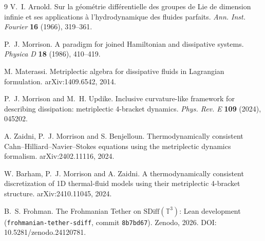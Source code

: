 \documentclass[11pt,a4paper]{article}
\begin{document}
\begin{thebibliography}{9}
V.~I. Arnold.
\newblock Sur la géométrie différentielle des groupes de Lie de dimension infinie et ses applications à l'hydrodynamique des fluides parfaits.
\newblock \emph{Ann. Inst. Fourier} \textbf{16} (1966), 319--361.

P.~J. Morrison.
\newblock A paradigm for joined Hamiltonian and dissipative systems.
\newblock \emph{Physica D} \textbf{18} (1986), 410--419.

M. Materassi.
\newblock Metriplectic algebra for dissipative fluids in Lagrangian formulation.
\newblock arXiv:1409.6542, 2014.

P.~J. Morrison and M.~H. Updike.
\newblock Inclusive curvature-like framework for describing dissipation: metriplectic 4-bracket dynamics.
\newblock \emph{Phys. Rev. E} \textbf{109} (2024), 045202.

A. Zaidni, P.~J. Morrison and S. Benjelloun.
\newblock Thermodynamically consistent Cahn--Hilliard--Navier--Stokes equations using the metriplectic dynamics formalism.
\newblock arXiv:2402.11116, 2024.

W. Barham, P.~J. Morrison and A. Zaidni.
\newblock A thermodynamically consistent discretization of 1D thermal-fluid models using their metriplectic 4-bracket structure.
\newblock arXiv:2410.11045, 2024.

B.~S. Frohman.
\newblock The Frohmanian Tether on \(\mathrm{SDiff}(\mathbb{T}^3)\): Lean development
(\texttt{frohmanian-tether-sdiff}, commit \texttt{8b7bd67}).
\newblock Zenodo, 2026. DOI: 10.5281/zenodo.24120781.
\end{thebibliography}
\end{document}
